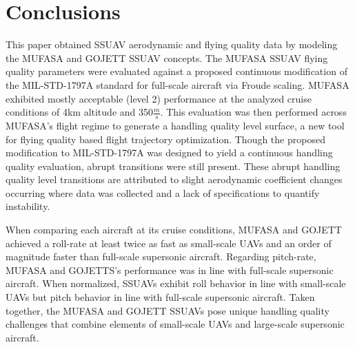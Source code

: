 \section{Conclusions} \label{sec:Conclusion}

This paper obtained SSUAV aerodynamic and flying quality data by modeling the MUFASA and GOJETT SSUAV concepts. 
The MUFASA SSUAV flying quality parameters were evaluated against a proposed continuous modification of the MIL-STD-1797A standard for full-scale aircraft via Froude scaling. 
MUFASA exhibited mostly acceptable (level 2) performance at the analyzed cruise conditions of 4km altitude and 350$\tfrac{m}{s}$. 
This evaluation was then performed across MUFASA's flight regime to generate a handling quality level surface, a new tool for flying quality based flight trajectory optimization. 
Though the proposed modification to MIL-STD-1797A was designed to yield a continuous handling quality evaluation, abrupt transitions were still present. 
These abrupt handling quality level transitions are attributed to slight aerodynamic coefficient changes occurring where data was collected and a lack of specifications to quantify instability. 


When comparing each aircraft at its cruise conditions, MUFASA and GOJETT achieved a roll-rate at least twice as fast as small-scale UAVs and an order of magnitude faster than full-scale supersonic aircraft. 
Regarding pitch-rate, MUFASA and GOJETTS's performance was in line with full-scale supersonic aircraft. 
When normalized, SSUAVs exhibit roll behavior in line with small-scale UAVs but pitch behavior in line with full-scale supersonic aircraft. 
Taken together, the MUFASA and GOJETT SSUAVs pose unique handling quality challenges that combine elements of small-scale UAVs and large-scale supersonic aircraft. 
